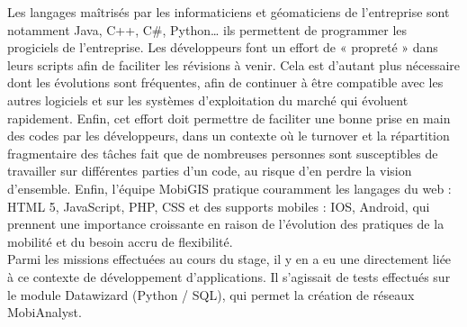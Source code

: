 Les langages maîtrisés par les informaticiens et géomaticiens de l’entreprise sont notamment Java, C++, C#, Python… ils permettent de programmer les progiciels de l’entreprise. Les développeurs font un effort de « propreté » dans leurs scripts afin de faciliter les révisions à venir. Cela est d’autant plus nécessaire dont les évolutions sont fréquentes, afin de continuer à être compatible avec les autres logiciels et sur les systèmes d’exploitation du marché qui évoluent rapidement. Enfin, cet effort doit permettre de faciliter une bonne prise en main des codes par les développeurs, dans un contexte où le turnover et la répartition fragmentaire des tâches fait que de nombreuses personnes sont susceptibles de travailler sur différentes parties d’un code, au risque d’en perdre la vision d’ensemble. Enfin, l’équipe MobiGIS pratique couramment les langages du web : HTML 5, JavaScript, PHP, CSS et des supports mobiles : IOS, Android, qui prennent une importance croissante en raison de l’évolution des pratiques de la mobilité et du besoin accru de flexibilité. \\

Parmi les missions effectuées au cours du stage, il y en a eu une directement liée à ce contexte de développement d’applications. Il s’agissait de tests effectués sur le module Datawizard (Python / SQL), qui permet la création de réseaux MobiAnalyst.\\
